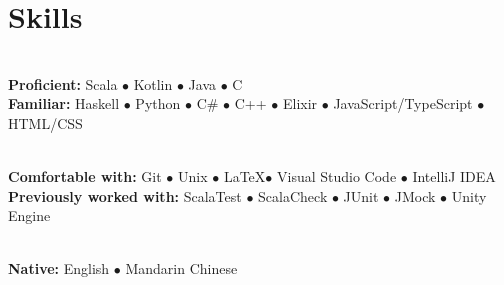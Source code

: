 \documentclass[10pt]{article}
\begin{document}
\section{Skills}

 \\
\textbf{Proficient: } Scala $\bullet$ Kotlin $\bullet$ Java $\bullet$ C \\
\textbf{Familiar: } Haskell $\bullet$ Python $\bullet$ C\# $\bullet$ C++ $\bullet$ Elixir $\bullet$ JavaScript/TypeScript $\bullet$ HTML/CSS
\entrysep

 \\
\textbf{Comfortable with: } Git $\bullet$ Unix $\bullet$ \LaTeX $\bullet$ Visual Studio Code $\bullet$ IntelliJ IDEA \\
\textbf{Previously worked with: } ScalaTest $\bullet$ ScalaCheck $\bullet$ JUnit $\bullet$ JMock $\bullet$ Unity Engine
\entrysep

 \\
\textbf{Native: } English $\bullet$ Mandarin Chinese

\end{document}
